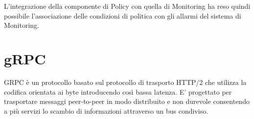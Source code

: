 L'integrazione della componente di Policy con quella di Monitoring ha reso quindi possibile l'associazione delle condizioni di politica con gli allarmi del sistema di Monitoring.



\section{gRPC} \label{grpc}
GRPC è un protocollo basato sul protocollo di trasporto HTTP/2 che utilizza la codifica orientata ai byte introducendo così bassa latenza.
E' progettato per trasportare messaggi peer-to-peer in modo distribuito e non durevole consentendo a più servizi lo scambio di informazioni attraverso un bus condiviso.


